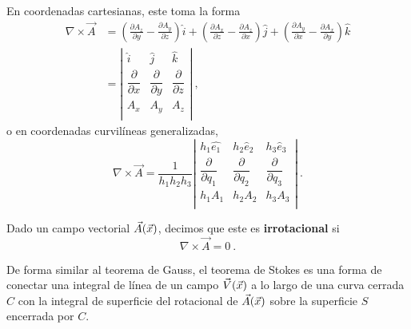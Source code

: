 En coordenadas cartesianas, este toma la forma 
\begin{align}
    \nonumber \nabla \times \vec{A} & = \left( \frac{\partial A_z}{\partial y} - \frac{\partial A_y}{\partial z} \right) \hat{i} + \left( \frac{\partial A_x}{\partial z} - \frac{\partial A_z}{\partial x} \right) \hat{j} + \left( \frac{\partial A_y}{\partial x} - \frac{\partial A_x}{\partial y} \right) \hat{k} \\
    & = \left|
    \begin{array}{ccc}
        \hat{i} & \hat{j} & \hat{k} \\
        \dfrac{\partial}{\partial x} & \dfrac{\partial}{\partial y} & \dfrac{\partial}{\partial z} \\
        A_x & A_y & A_z \\
    \end{array}
    \right| \ ,
\end{align}
o en coordenadas curvilíneas generalizadas,
\begin{equation}
    \nabla \times \vec{A} = \frac{1}{h_1 h_2 h_3} \left| 
    \begin{array}{ccc}
        h_1 \hat{e_1} & h_2 \hat{e}_2 & h_3 \hat{e}_3 \\
        \dfrac{\partial}{\partial q_1} & \dfrac{\partial}{\partial q_2} & \dfrac{\partial}{\partial q_3} \\
        h_1 A_1 & h_2 A_2 & h_3 A_3 \\
    \end{array}
    \right| \ .
\end{equation}

\begin{defi}
    Dado un campo vectorial $\vec{A}(\vec{x})$, decimos que este es \textbf{irrotacional} si 
    \begin{equation}
        \nabla \times \vec{A} = 0 \ .
    \end{equation}
\end{defi}


De forma similar al teorema de Gauss, el teorema de Stokes es una forma de conectar una integral de línea de un campo $\vec{V}(\vec{x})$ a lo largo de una curva cerrada $C$ con la integral de superficie del rotacional de $\vec{A}(\vec{x})$ sobre la superficie $S$ encerrada por $C$.

